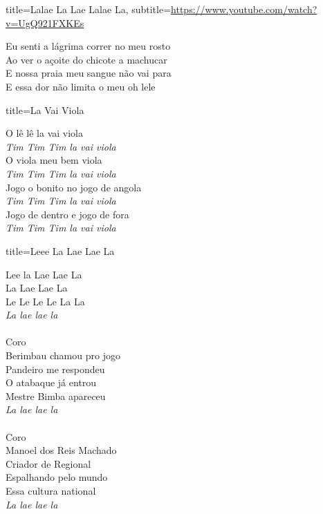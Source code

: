 \documentclass[fontsize=14pt, paper=a4, twoside, DIV=20]{scrreprt} %
\begin{document}
\begin{multicols*}{2}
\begin{song}{title={Lalae La Lae Lalae La}, subtitle={\url{https://www.youtube.com/watch?v=UgQ921FXKEs}}}
{\begin{verse*}
            Eu senti a lágrima correr no meu rosto \\
            Ao ver o açoite do chicote a machucar \\
            E nossa praia meu sangue não vai para \\
            E essa dor não limita o meu oh lele \\
    \end{verse*}}
\end{song}

\begin{song}{title={La Vai Viola}}
    \begin{verse*}
        O lê lê la vai viola\\
        \textit{Tim Tim Tim la vai viola}\\
        O viola meu bem viola\\
        \textit{Tim Tim Tim la vai viola}\\
        Jogo o bonito no jogo de angola\\
        \textit{Tim Tim Tim la vai viola}\\
        Jogo de dentro e jogo de fora\\
        \textit{Tim Tim Tim la vai viola}\\
        \end{verse*}
\end{song}

\begin{song}{title={Leee La Lae Lae La}}
        \begin{verse*}
            Lee la Lae Lae La\\
            La Lae Lae La\\
            Le Le Le Le La La\\
            \textit{La lae lae la}\\
\\
            Coro\\
            Berimbau chamou pro jogo\\
            Pandeiro me respondeu\\
            O atabaque já entrou\\
            Mestre Bimba apareceu\\
            \textit{La lae lae la}\\
\\
            Coro\\
            Manoel dos Reis Machado\\
            Criador de Regional\\
            Espalhando pelo mundo\\
            Essa cultura national\\
            \textit{La lae lae la}\\


\end{verse*}
\end{song}
\end{multicols*}
\end{document}
